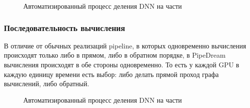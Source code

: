 \begin{figure}[h]%
	\centering
	\caption{Автоматизированный процесс деления DNN на части}
	\label{framework} %
\end{figure}

\subsubsection{Последовательность вычисления}
\indent\setlength{\parindent}{1em}
В отличие от обычных реализаций pipeline, в которых одновременно вычисления происходят только либо в прямом, либо в обратном порядке, в PipeDream вычисления происходят в обе стороны одновременно. То есть у каждой GPU в каждую единицу времени есть выбор: либо делать прямой проход графа вычислений, либо обратный. 

\begin{figure}[h]%
	\centering
	\caption{Автоматизированный процесс деления DNN на части}
	\label{framework} %
\end{figure}


